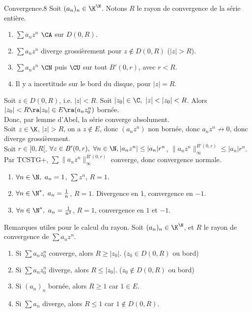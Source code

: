 \documentclass[11pt]{article}
\begin{document}
\begin{thm}{Convergence.}{8}
    Soit $(a_n)_n \in \K^\N$. Notons $R$ le rayon de convergence de la série entière.
    \begin{enumerate}
        \item $\sum a_nz^n$ $\CA$ sur $D(0,R)$.
        \item $\sum a_nz^n$ diverge grossièrement pour $z \notin D(0,R)$ ($|z|>R$).
        \item $\sum a_nz^n$ $\CN$ puis $\CU$ sur tout $B'(0,r)$, avec $r<R$. 
        \item Il y a incertitude sur le bord du disque, pour $|z|=R$.
    \end{enumerate}
    \tcblower
     Soit $z\in D(0,R)$, i.e. $|z|<R$. Soit $|z_0|\in \C, ~ |z|<|z_0|<R$. Alors $|z_0|<R\ra|z_0|\in E \ra (a_nz_0^n)$ bornée.\\
    Donc, par lemme d'Abel, la série converge absolument.\\
     Soit $z\in\K$, $|z|>R$, on a $z\notin E$, donc $(a_nz^n)$ non bornée, donc $a_nz^n\not\to0$, donc diverge grossièrement.\\
     Soit $r\in[0,R[$. $\forall z \in B'(0,r), ~ \forall n \in \N, |a_nz^n|\leq|a_n|r^n$, $\|a_nz^n\|_{\infty}^{B'(0,r)}\leq|a_n|r^n$.\\
    Par TCSTG+, $\sum\|a_nz^n\|_\infty^{B'(0,r)}$ converge, donc convergence normale.
\end{thm}

\vspace*{-0.8cm}

\begin{ex}{}{}
    \begin{enumerate}
        \item $\forall n \in \N, ~ a_n = 1$, $\sum z^n$, $R=1$.
        \item $\forall n \in \N^*, ~ a_n = \frac{1}{n}$, $R=1$. Divergence en 1, convergence en $-1$.
        \item $\forall n \in \N^*, ~ a_n = \frac{1}{n^2}$, $R=1$, convergence en $1$ et $-1$.
    \end{enumerate}
\end{ex}

\vspace*{-0.8cm}

\begin{prop}{Remarques utiles pour le calcul du rayon.}{}
    Soit $(a_n)_n\in\K^\N$, et $R$ le rayon de convergence de $\sum a_nz^n$.
    \begin{enumerate}
        \item Si $\sum a_nz_0^n$ converge, alors $R\geq |z_0|$. ($z_0\in D(0,R)$ ou bord)
        \item Si $\sum a_nz_0^n$ diverge, alors $R\leq |z_0|$. ($z_0\notin D(0,R)$ ou bord)
        \item Si $(a_n)_n$ bornée, alors $R\geq1$ car $1\in E$.
        \item Si $\sum a_n$ diverge, alors $R\leq 1$ car $1\notin D(0,R)$.
    \end{enumerate}
\end{prop}
\end{document}
